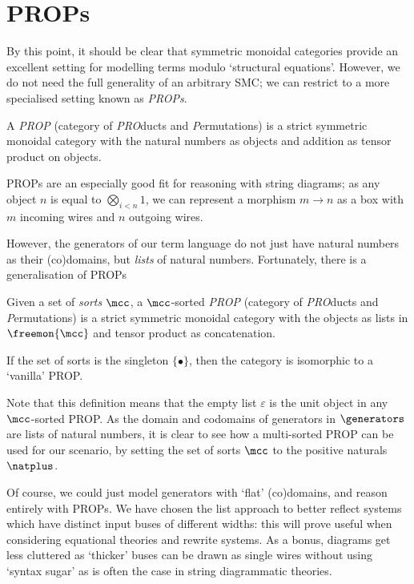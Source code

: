 \section{PROPs}

By this point, it should be clear that symmetric monoidal categories provide
an excellent setting for modelling terms modulo `structural equations'.
However, we do not need the full generality of an arbitrary SMC; we can restrict
to a more specialised setting known as \emph{PROPs}.

\begin{definition}
    A \emph{PROP} (category of \emph{PRO}ducts and \emph{P}ermutations) is a
    strict symmetric monoidal category with the natural numbers as objects and
    addition as tensor product on objects.
\end{definition}

PROPs are an especially good fit for reasoning with string diagrams; as any
object \(n\) is equal to \(\bigotimes_{i < n} 1\), we can represent a morphism
\(m \to n\) as a box with \(m\) incoming wires and \(n\) outgoing wires.

However, the generators of our term language do not just have natural numbers
as their (co)domains, but \emph{lists} of natural numbers.
Fortunately, there is a generalisation of PROPs

\begin{definition}
    Given a set of \emph{sorts} \(\mcc\), a \(\mcc\)-sorted \emph{PROP}
    (category of \emph{PRO}ducts and \emph{P}ermutations) is a strict symmetric
    monoidal category with the objects as lists in \(\freemon{\mcc}\) and tensor
    product as concatenation.
\end{definition}

\begin{remark}
    If the set of sorts is the singleton \(\{\bullet\}\), then the category is
    isomorphic to a `vanilla' PROP.
\end{remark}

Note that this definition means that the empty list \(\varepsilon\) is the unit
object in any \(\mcc\)-sorted PROP.
As the domain and codomains of generators in \(\generators\) are lists of
natural numbers, it is clear to see how a multi-sorted PROP can be used for our
scenario, by setting the set of sorts \(\mcc\) to the positive naturals
\(\natplus\).

\begin{remark}
    Of course, we could just model generators with `flat' (co)domains, and
    reason entirely with PROPs.
    We have chosen the list approach to better reflect systems which have
    distinct input buses of different widths: this will prove useful when
    considering equational theories and rewrite systems.
    As a bonus, diagrams get less cluttered as `thicker' buses can be drawn
    as single wires without using `syntax sugar' as is often the case in string
    diagrammatic theories.
\end{remark}